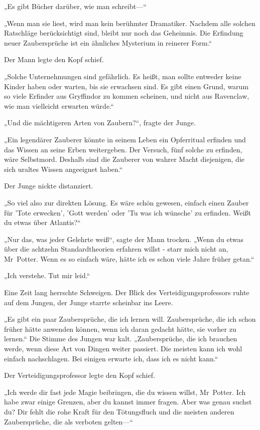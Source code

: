 {„Es gibt Bücher darüber, wie man schreibt—“

„Wenn man sie liest, wird man kein berühmter Dramatiker. Nachdem alle solchen Ratschläge berücksichtigt sind, bleibt nur noch das Geheimnis. Die Erfindung neuer Zaubersprüche ist ein ähnliches Mysterium in reinerer Form.“

Der Mann legte den Kopf schief.

„Solche Unternehmungen sind gefährlich. Es heißt, man sollte entweder keine Kinder haben oder warten, bis sie erwachsen sind. Es gibt einen Grund, warum so viele Erfinder aus Gryffindor zu kommen scheinen, und nicht aus Ravenclaw, wie man vielleicht erwarten würde.“

„Und die mächtigeren Arten von Zaubern?“, fragte der Junge.

„Ein legendärer Zauberer könnte in seinem Leben ein Opferritual erfinden und das Wissen an seine Erben weitergeben. Der Versuch, fünf solche zu erfinden, wäre Selbstmord. Deshalb sind die Zauberer von wahrer Macht diejenigen, die sich uraltes Wissen angeeignet haben.“

Der Junge nickte distanziert.

„So viel also zur direkten Lösung. Es wäre schön gewesen, einfach einen Zauber für 'Tote erwecken', 'Gott werden' oder 'Tu was ich wünsche' zu erfinden. Weißt du etwas über Atlantis?“

„Nur das, was jeder Gelehrte weiß“, sagte der Mann trocken. „Wenn du etwas über die achtzehn Standardtheorien erfahren willst - starr mich nicht an, Mr~Potter. Wenn es so einfach wäre, hätte ich es schon viele Jahre früher getan.“

„Ich verstehe. Tut mir leid.“

Eine Zeit lang herrschte Schweigen. Der Blick des Verteidigungsprofessors ruhte auf dem Jungen, der Junge starrte scheinbar ins Leere.

„Es gibt ein paar Zaubersprüche, die ich lernen will. Zaubersprüche, die ich schon früher hätte anwenden können, wenn ich daran gedacht hätte, sie vorher zu lernen.“ Die Stimme des Jungen war kalt. „Zaubersprüche, die ich brauchen werde, wenn diese Art von Dingen weiter passiert. Die meisten kann ich wohl einfach nachschlagen. Bei einigen erwarte ich, dass ich es nicht kann.“

Der Verteidigungsprofessor legte den Kopf schief.

„Ich werde dir fast jede Magie beibringen, die du wissen willst, Mr~Potter. Ich habe zwar einige Grenzen, aber du kannst immer fragen. Aber was genau suchst du? Dir fehlt die rohe Kraft für den Tötungsfluch und die meisten anderen Zaubersprüche, die als verboten gelten—“

}

